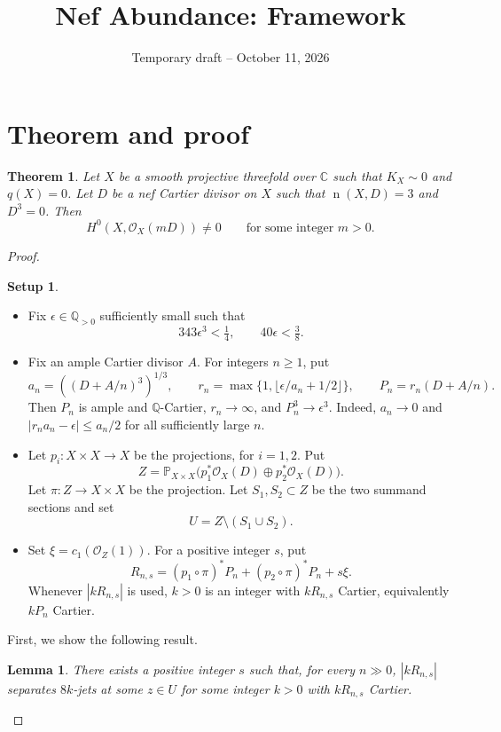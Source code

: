 \documentclass[12pt,a4paper,psamsfonts]{amsart}
\title{Nef Abundance: Framework}
\date{Temporary draft -- October 11, 2026}
\newtheorem*{theorem}{Theorem}
\theoremstyle{definition}
\newtheorem*{setup}{Setup}
\theoremstyle{plain}
\newtheorem{lemma}{Lemma}[section]
\newcommand{\Q}{\mathbb Q}
\newcommand{\C}{\mathbb C}
\newcommand{\OO}{\mathcal O}
\newcommand{\nef}{\operatorname{n}}
\begin{document}
\maketitle

\section{Theorem and proof}

\begin{theorem}
Let $X$ be a smooth projective threefold over $\C$ such that
$K_X\sim0$ and $q(X)=0$. Let $D$ be a nef Cartier divisor on $X$
such that $\nef(X,D)=3$ and $D^3=0$. Then
\[
 H^0(X,\OO_X(mD))\ne0
 \qquad\text{for some integer }m>0.
\]
\end{theorem}

\begin{proof}
\begin{setup}
\leavevmode
\begin{itemize}
\setlength{\itemsep}{2pt}
\setlength{\parsep}{0pt}
\item Fix $\epsilon\in\Q_{>0}$ sufficiently small such that
\[
 343\epsilon^3<\tfrac14,\qquad40\epsilon<\tfrac38.
\]
\item Fix an ample Cartier divisor $A$.
For integers $n\ge1$, put
\[
 a_n=((D+A/n)^3)^{1/3},\qquad
 r_n=\max\{1,\lfloor\epsilon/a_n+1/2\rfloor\},\qquad
 P_n=r_n(D+A/n).
\]
Then $P_n$ is ample and $\mathbb{Q}$-Cartier, $r_n\to\infty$, and
$P_n^3\to\epsilon^3$. Indeed, $a_n\to0$ and
$|r_na_n-\epsilon|\le a_n/2$ for all sufficiently large $n$.
\item Let $p_i:X\times X\to X$ be the projections, for $i=1,2$.
Put
\[
 Z=\mathbb P_{X\times X}
       \bigl(p_1^*\OO_X(D)\oplus p_2^*\OO_X(D)\bigr).
\]
Let $\pi:Z\to X\times X$ be the projection.
Let $S_1,S_2\subset Z$ be the two summand sections and set
\[
 U=Z\setminus(S_1\cup S_2).
\]
\item Set $\xi=c_1(\OO_Z(1))$. For a positive integer $s$, put
\[
 R_{n,s}=(p_1\circ\pi)^*P_n+(p_2\circ\pi)^*P_n+s\xi.
\]
Whenever $|kR_{n,s}|$ is used, $k>0$ is an integer with
$kR_{n,s}$ Cartier, equivalently $kP_n$ Cartier.
\end{itemize}

\end{setup}

First, we show the following result.

\begin{lemma}\label{lem:framework-jets}
There exists a positive integer $s$ such that, for every $n\gg0$,
$|kR_{n,s}|$ separates $8k$-jets at some $z\in U$ for some
integer $k>0$ with $kR_{n,s}$ Cartier.
\end{lemma}


\end{proof}
\end{document}
